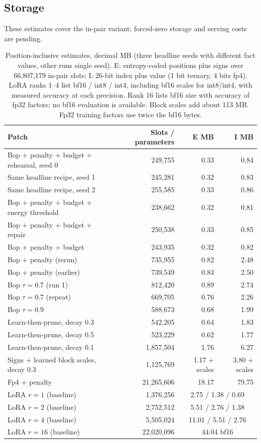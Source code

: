\documentclass[11pt]{article}
\begin{document}
\subsection{Storage}
These estimates cover the in-pair variant; forced-zero storage and serving costs are pending.
\begin{table}[!ht]\centering\small
\setlength{\tabcolsep}{4pt}
\begin{tabular}{lrrr}\toprule
Patch & Slots / parameters & E MB & I MB\\\midrule
Bop + penalty + budget + rehearsal, seed 0 & 249,755 & 0.33 & 0.84\\
Same headline recipe, seed 1 & 245,281 & 0.32 & 0.83\\
Same headline recipe, seed 2 & 255,585 & 0.33 & 0.86\\
Bop + penalty + budget + energy threshold & 238,662 & 0.32 & 0.81\\
Bop + penalty + budget + repair & 250,538 & 0.33 & 0.85\\
Bop + penalty + budget & 243,935 & 0.32 & 0.82\\
Bop + penalty (rerun) & 735,955 & 0.82 & 2.48\\
Bop + penalty (earlier) & 739,549 & 0.83 & 2.50\\
Bop $\tau=0.7$ (run 1) & 812,420 & 0.89 & 2.74\\
Bop $\tau=0.7$ (repeat) & 669,705 & 0.76 & 2.26\\
Bop $\tau=0.9$ & 588,673 & 0.68 & 1.99\\
Learn-then-prune, decay 0.3 & 542,205 & 0.64 & 1.83\\
Learn-then-prune, decay 0.5 & 523,229 & 0.62 & 1.77\\
Learn-then-prune, decay 0.1 & 1,857,504 & 1.76 & 6.27\\
Signs + learned block scales, decay 0.3 & 1,125,769 & 1.17 + scales & 3.80 + scales\\
Fp4 + penalty & 21,265,606 & 18.17 & 79.75\\
LoRA $r=1$ (baseline) & 1,376,256 & \multicolumn{2}{c}{2.75 / 1.38 / 0.69}\\
LoRA $r=2$ (baseline) & 2,752,512 & \multicolumn{2}{c}{5.51 / 2.76 / 1.38}\\
LoRA $r=4$ (baseline) & 5,505,024 & \multicolumn{2}{c}{11.01 / 5.51 / 2.76}\\
LoRA $r=16$ (baseline) & 22,020,096 & \multicolumn{2}{c}{44.04 bf16}\\\bottomrule
\end{tabular}
\caption{Position-inclusive estimates, decimal MB (three headline seeds with different fact values, other runs single seed). E: entropy-coded positions
plus signs over 66,807,179 in-pair slots; I: 26-bit index plus value (1 bit ternary, 4 bits fp4).
LoRA ranks 1--4 list bf16 / int8 / int4, including bf16 scales for int8/int4, with measured accuracy
at each precision. Rank 16 lists bf16 size with accuracy of fp32 factors; no bf16 evaluation is available.
Block scales add about 113 MB. Fp32 training factors use twice the bf16 bytes.}
\label{tab:storage}
\end{table}
\end{document}
